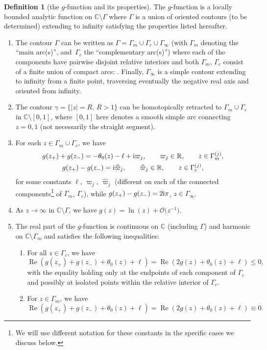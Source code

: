 \documentclass[pdftex]{sigma}
\numberwithin{equation}{section}
\theoremstyle{definition}
\newtheorem{Definition}[Theorem]{Definition}
\def\le{\left}
\def\ri{\right}
\def \wh{\widehat}
\def\C{{\mathbb C}}
\def\R{{\mathbb R}}
\def \Re{\operatorname{Re} }
\begin{document}
\begin{Definition}[the $g$-function and its properties]
\label{gdef}
The $g$-function is a locally bounded analytic function on $\C\setminus \Gamma$ where $\Gamma$ is a union of oriented contours (to be determined) extending to infinity satisfying the properties listed hereafter.
\begin{enumerate}\itemsep=0pt
\item[(1)] The contour $\Gamma$ can be written as $\Gamma = \Gamma_{m} \cup \Gamma_{c} \cup \Gamma_{\infty}$ (with $\Gamma_{m}$ denoting the ``main arc(s)'', and~$\Gamma_{c}$ the ``complementary arc(s)'') where each of the components have pairwise disjoint relative interiors and both $\Gamma_{m}$, $\Gamma_{c}$ consist of a finite union of compact arcs: . Finally, $\Gamma_\infty$ is a simple contour extending to infinity from a finite point, traversing eventually the negative real axis and oriented from infinity.
\item[(2)] The contour $\gamma=\{|z|=R, \, R>1\}$ can be homotopically retracted to $\Gamma_m\cup \Gamma_c$ in $\C \setminus [0,1]$, where $[0,1]$ here denotes a smooth simple arc connecting $z=0,1$ (not necessarily the straight segment).
\item[(3)] For each $z\in \Gamma_m\cup \Gamma_c$, we have
\begin{gather*}
g(z_+) + g(z_-) =- \theta_0(z) -\ell + {\rm i}{\varpi}_j, \qquad {\varpi}_j\in\R, \qquad z\in \Gamma_m^{(j)},\\
g(z_+)-g(z_-) = {\rm i} {\wh \varpi}_j, \qquad {\wh \varpi}_j\in\R, \qquad z\in \Gamma_c^{(j)},
\end{gather*}
for some constants $\ell$, $\varpi_j$, $\wh \varpi_j$ (different on each of the connected components\footnote{We will use different notation for these constants in the specific cases we discuss below.} of $\Gamma_m$, $ \Gamma_c$),
while
$
g(z_+)-g(z_-) = 2{\rm i}\pi$, $ z\in \Gamma_\infty$.
\item[(4)] As $z\to\infty$ in $\C\setminus \Gamma $, we have
$%
g(z) = \ln(z) + \mathcal O\bigl(z^{-1}\bigr)$.
\item[(5)] The real part of the $g$-function is continuous on $\C$ (including $\Gamma$) and harmonic on $\C \setminus \Gamma_m$ and
satisfies the following inequalities:
\begin{enumerate}\itemsep=0pt
\item[(i)] For all $z\in \Gamma_c$, we have
\[
\Re\le(g(z_+)+g(z_-)+ \theta_0(z) + \ell \ri) = \Re\le(2g(z)+ \theta_0(z) + \ell \ri) \leq 0,
\]
 with the equality holding only at the endpoints of each component of $\Gamma_c$ and possibly at isolated points within the relative interior of $\Gamma_c$.
\item[(ii)] For $z\in \Gamma_m$, we have
\[
\Re \le(g(z_+)+g(z_-)+ \theta_0(z) + \ell \ri)= \Re \le(2g(z)+ \theta_0(z) + \ell \ri) \equiv 0.
\]


\end{enumerate}
\end{enumerate}
\end{Definition}
\end{document}
